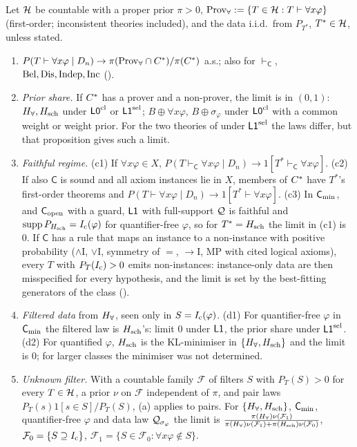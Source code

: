 \begin{theorem}\label{thm:univ:omega}
Let $\mathcal{H}$ be countable with a proper prior $\pi>0$, $\mathrm{Prov}_{\forall}:=\{T\in\mathcal{H}:T\vdash\forall x\varphi\}$ (first-order; inconsistent theories included), and the data i.i.d.\ from $P_{T^*}$, $T^*\in\mathcal{H}$, unless stated.
\begin{enumerate}[label=(\alph*),leftmargin=*,itemsep=1pt]
\item $P(T\vdash\forall x\varphi\mid D_n)\to\pi(\mathrm{Prov}_{\forall}\cap C^{*})/\pi(C^{*})$ a.s.; also for $\vdash_{\mathsf C}$, $\mathrm{Bel},\mathrm{Dis},\mathrm{Indep},\mathrm{Inc}$ ().
\item \emph{Prior share.} If $C^{*}$ has a prover and a non-prover, the limit is in $(0,1)$: $H_{\forall},H_{\mathrm{sch}}$ under $\mathord{\mathsf{L0}}^{\mathrm{cl}}$ or $\mathord{\mathsf{L1}}^{\mathrm{sel}}$; $B\oplus\forall x\varphi$, $B\oplus\sigma_\varphi$ under $\mathord{\mathsf{L0}}^{\mathrm{cl}}$ with a common weight or weight prior. For the two theories of  under $\mathord{\mathsf{L1}}^{\mathrm{sel}}$ the laws differ, but that proposition gives such a limit.
\item \emph{Faithful regime.} (c1) If $\forall x\varphi\in X$, $P(T\vdash_{\mathsf C}\forall x\varphi\mid D_n)\to1[T^*\vdash_{\mathsf C}\forall x\varphi]$. (c2) If also $\mathsf C$ is sound and all axiom instances lie in $X$, members of $C^{*}$ have $T^*$'s first-order theorems and $P(T\vdash\forall x\varphi\mid D_n)\to1[T^*\vdash\forall x\varphi]$. (c3) In $\mathsf{C}_{\min}$, and $\mathsf{C}_{\mathrm{open}}$ with a guard, $\mathord{\mathsf{L1}}$ with full-support $\mathcal{Q}$ is faithful and $\operatorname{supp}P_{H_{\mathrm{sch}}}=I_{\mathrm{c}}(\varphi)$ for quantifier-free $\varphi$, so for $T^*=H_{\mathrm{sch}}$ the limit in (c1) is $0$. If $\mathsf C$ has a rule that maps an instance to a non-instance with positive probability ($\wedge$I, $\vee$I, symmetry of $=$, $\to$I, MP with cited logical axioms), every $T$ with $P_T(I_{\mathrm{c}})>0$ emits non-instances: instance-only data are then misspecified for every hypothesis, and the limit is set by the best-fitting generators of the class ().
\item \emph{Filtered data} from $H_{\forall}$, seen only in $S=I_{\mathrm{c}}(\varphi)$. (d1) For quantifier-free $\varphi$ in $\mathsf{C}_{\min}$ the filtered law is $H_{\mathrm{sch}}$'s: limit $0$ under $\mathord{\mathsf{L1}}$, the prior share under $\mathord{\mathsf{L1}}^{\mathrm{sel}}$. (d2)  For quantified $\varphi$, $H_{\mathrm{sch}}$ is the KL-minimiser in $\{H_{\forall},H_{\mathrm{sch}}\}$ and the limit is $0$; for larger classes the minimiser was not determined.
\item \emph{Unknown filter.} With a countable family $\mathcal F$ of filters $S$ with $P_T(S)>0$ for every $T\in\mathcal{H}$, a prior $\nu$ on $\mathcal F$ independent of $\pi$, and pair laws $P_T(s)1[s\in S]/P_T(S)$, (a) applies to pairs. For $\{H_{\forall},H_{\mathrm{sch}}\}$, $\mathsf{C}_{\min}$, quantifier-free $\varphi$ and data law $\mathcal{Q}_{\sigma_\varphi}$ the limit is $\frac{\pi(H_{\forall})\nu(\mathcal F_1)}{\pi(H_{\forall})\nu(\mathcal F_1)+\pi(H_{\mathrm{sch}})\nu(\mathcal F_0)}$, $\mathcal F_0=\{S\supseteq I_{\mathrm{c}}\}$, $\mathcal F_1=\{S\in\mathcal F_0:\forall x\varphi\notin S\}$.
\end{enumerate}
\end{theorem}

